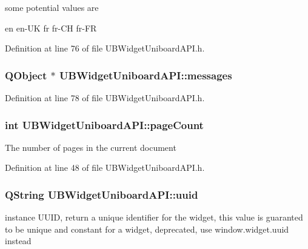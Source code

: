 some potential values are

en en-\/\-U\-K fr fr-\/\-C\-H fr-\/\-F\-R 

Definition at line 76 of file U\-B\-Widget\-Uniboard\-A\-P\-I.\-h.

\hypertarget{class_u_b_widget_uniboard_a_p_i_af8192ae436ee2f79a49bac901f877e89}{
\subsubsection[{messages}]{\setlength{\rightskip}{0pt plus 5cm}Q\-Object $\ast$ U\-B\-Widget\-Uniboard\-A\-P\-I\-::messages\hspace{0.3cm}{\ttfamily [read]}}}\label{d5/d2b/class_u_b_widget_uniboard_a_p_i_af8192ae436ee2f79a49bac901f877e89}


Definition at line 78 of file U\-B\-Widget\-Uniboard\-A\-P\-I.\-h.

\hypertarget{class_u_b_widget_uniboard_a_p_i_a497eb60c084a0eb527c13730d5575756}{
\subsubsection[{page\-Count}]{\setlength{\rightskip}{0pt plus 5cm}int U\-B\-Widget\-Uniboard\-A\-P\-I\-::page\-Count\hspace{0.3cm}{\ttfamily [read]}}}\label{d5/d2b/class_u_b_widget_uniboard_a_p_i_a497eb60c084a0eb527c13730d5575756}
The number of pages in the current document 

Definition at line 48 of file U\-B\-Widget\-Uniboard\-A\-P\-I.\-h.

\hypertarget{class_u_b_widget_uniboard_a_p_i_a1d94cb1a20327d9b7f84432d6098e939}{
\subsubsection[{uuid}]{\setlength{\rightskip}{0pt plus 5cm}Q\-String U\-B\-Widget\-Uniboard\-A\-P\-I\-::uuid\hspace{0.3cm}{\ttfamily [read]}}}\label{d5/d2b/class_u_b_widget_uniboard_a_p_i_a1d94cb1a20327d9b7f84432d6098e939}
instance U\-U\-I\-D, return a unique identifier for the widget, this value is guaranted to be unique and constant for a widget, deprecated, use window.\-widget.\-uuid instead 

